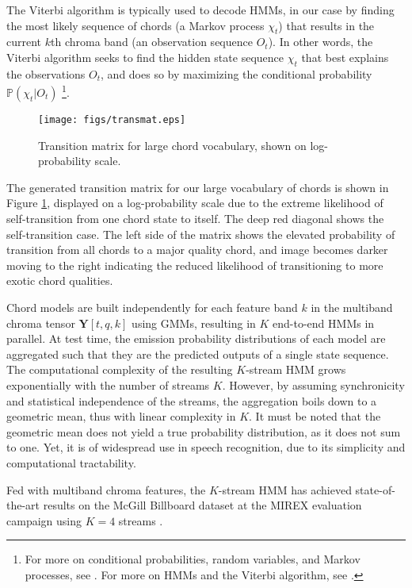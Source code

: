 The Viterbi algorithm is typically used to decode HMMs, in our case by finding the most likely sequence of chords (a Markov process $\chi_{t}$) that results in the current $k$th chroma band (an observation sequence $O_t$). In other words, the Viterbi algorithm seeks to find the hidden state sequence $\chi_t$ that best explains the observations $O_t$, and does so by maximizing the conditional probability $\mathds{P}(\chi_t | O_t)$
\footnote{For more on conditional probabilities, random variables, and Markov processes, see \cite{probabilityEssentials}. For more on HMMs and the Viterbi algorithm, see \cite{rabiner1989tutorial}.}.

\begin{figure}
\begin{center}
\texttt{[image: figs/transmat.eps]}
\caption{Transition matrix for large chord vocabulary, shown on log-probability scale.}
\label{fig:transmat}
\end{center}
\end{figure}

The generated transition matrix for our large vocabulary of chords is shown in Figure \ref{fig:transmat}, displayed on a log-probability scale due to the extreme likelihood of self-transition from one chord state to itself. The deep red diagonal shows the self-transition case. The left side of the matrix shows the elevated probability of transition from all chords to a major quality chord, and image becomes darker moving to the right indicating the reduced likelihood of transitioning to more exotic chord qualities. 

Chord models are built independently for each feature band $k$ in the multiband chroma tensor $\mathbf{Y}[t,q,k]$ using GMMs, resulting in $K$ end-to-end HMMs in parallel. At test time, the emission probability distributions of each model are aggregated such that they are the predicted outputs of a single state sequence. The computational complexity of the resulting $K$-stream HMM grows exponentially
with the number of streams $K$.
However, by assuming synchronicity and statistical independence of the streams,
the aggregation boils down to a geometric mean, thus with linear complexity in $K$.
It must be noted that the geometric mean does not yield a true probability distribution, as
it does not sum to one.
Yet, it is of widespread use \eg in speech recognition, due to its simplicity and computational
tractability.

Fed with multiband chroma features, the $K$-stream HMM
has achieved state-of-the-art results on the McGill Billboard dataset at the
MIREX evaluation campaign using $K=4$ streams \cite{cho2013mirex}.